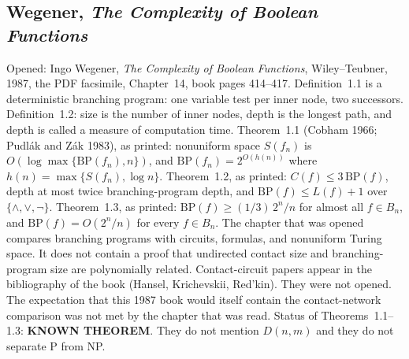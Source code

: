 \documentclass[11pt]{article}
\begin{document}
\subsection*{Wegener, \emph{The Complexity of Boolean Functions}}
Opened: Ingo Wegener, \emph{The Complexity of Boolean Functions}, Wiley--Teubner, 1987, the PDF facsimile, Chapter~14, book pages 414--417.
Definition~1.1 is a deterministic branching program: one variable test per inner node, two successors.
Definition~1.2: size is the number of inner nodes, depth is the longest path, and depth is called a measure of computation time.
Theorem~1.1 (Cobham 1966; Pudl\'ak and Z\'ak 1983), as printed: nonuniform space \(S(f_n)\) is \(O(\log\max\{\mathrm{BP}(f_n),n\})\), and \(\mathrm{BP}(f_n)=2^{O(h(n))}\) where \(h(n)=\max\{S(f_n),\log n\}\).
Theorem~1.2, as printed: \(C(f)\le 3\,\mathrm{BP}(f)\), depth at most twice branching-program depth, and \(\mathrm{BP}(f)\le L(f)+1\) over \(\{\wedge,\vee,\neg\}\).
Theorem~1.3, as printed: \(\mathrm{BP}(f)\ge(1/3)\,2^n/n\) for almost all \(f\in B_n\), and \(\mathrm{BP}(f)=O(2^n/n)\) for every \(f\in B_n\).
The chapter that was opened compares branching programs with circuits, formulas, and nonuniform Turing space.
It does not contain a proof that undirected contact size and branching-program size are polynomially related.
Contact-circuit papers appear in the bibliography of the book (Hansel, Krichevskii, Red'kin).
They were not opened.
The expectation that this 1987 book would itself contain the contact-network comparison was not met by the chapter that was read.
Status of Theorems~1.1--1.3: \textbf{KNOWN THEOREM}.
They do not mention \(D(n,m)\) and they do not separate P from NP.
\end{document}
